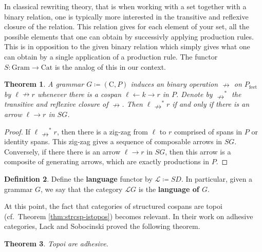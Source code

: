 \documentclass{amsart}
\newcommand{\C}{\cat{C}}
\newcommand{\Cat}{\cat{Cat}}
\newcommand{\Gram}{\cat{Gram}}
\newcommand{\Lang}{\mathcal{L}}
\newcommand{\defn}[1]{\textbf{#1}}
\newcommand{\cat}[1]{\mathrm{#1}}
\renewcommand{\t}[1]{\text{#1}}
\newcommand{\from}{\colon}
\newcommand{\rel}{\nrightarrow}
\newtheorem{theorem}{Theorem}[section]
\theoremstyle{remark}
\theoremstyle{definition}
\newtheorem{definition}[theorem]{Definition}
\begin{document}
In classical rewriting theory, that is when working with a set
together with a binary relation, one is typically more interested in
the transitive and reflexive closure of the relation. This relation
gives for each element of your set, all the possible elements that one
can obtain by successivly applying production rules.  This is in
opposition to the given binary relation which simply gives what one
can obtain by a single application of a production rule.  The functor
$ S \from \Gram \to \Cat $ is the analog of this in our context. 

\begin{theorem}

  A grammar $ G \coloneqq ( \C , P ) $ induces an binary operation
  $ \rel $ on $ P_{\t{feet}} $
  by $ \ell \rel r $ whenever there is a cospan
  $ \ell \gets k \to r $ in $ P $. Denote by $ \rel^\ast $ the
  transitive and reflexive closure of $ \nrightarrow $. Then $ \ell
  \rel^\ast r $ if and only if there is an arrow $ \ell \to r
  $ in $ SG $.
  
\end{theorem}
 
\begin{proof}

  If $ \ell \rel^\ast r $, then there is a zig-zag from $ \ell
  $ to $ r $ comprised of spans in $ P $ or identity spans.  This
  zig-zag gives a sequence of composable arrows in $ SG $.
  Conversely, if there there is an arrow $ \ell \to r $ in $ SG $,
  then this arrow is a composite of generating arrows, which are
  exactly productions in $ P $.
  
\end{proof}

\begin{definition}

  Define the \defn{language} functor by $ \Lang \coloneqq SD $. In
  particular, given a grammar $ G $, we say that the category $ \Lang
  G $ is the \defn{language of $ G $}.
  
\end{definition}

At this point, the fact that categories of structured cospans are
topoi (cf.~Theorem \ref{thm:strcsp-istopos}) becomes relevant. In
their work on adhesive categories, Lack and Sobocinski proved the
following theorem.  
% 
%

\begin{theorem} \label{thm:dpo_topoi-adhesive} 
  Topoi are adhesive.
\end{theorem}
\end{document}
